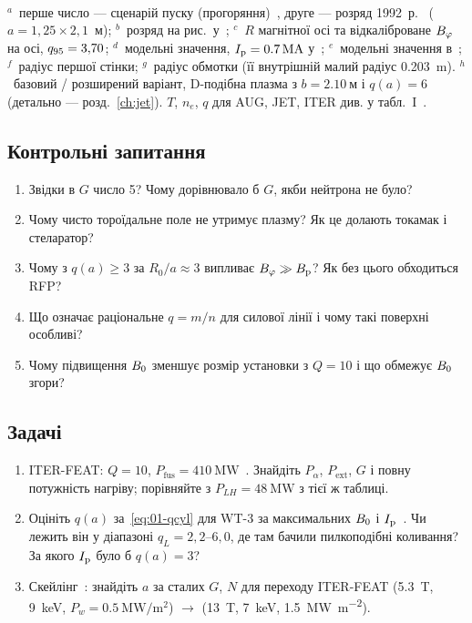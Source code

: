 \begin{table}[h]
\begin{tabular}{@{}lllllll@{}}
\bottomrule
\end{tabular}\\[2pt]
\parbox{\textwidth}{\footnotesize $^{a}$~перше число --- сценарій пуску (прогоряння)~\cite{Hoppe2022}, друге --- розряд 1992~р.~\cite{Fukuyama1992} ($a=1{,}25\times2{,}1$~м);
$^{b}$~розряд на рис.\ у~\cite{AhoMantila2011}; $^{c}$~$R$ магнітної осі та відкаліброване
$B_{\varphi}$ на осі, $q_{95}=3{,}70$; $^{d}$~модельні значення, $I_{\mathrm{p}}=\SI{0.7}{\mega\ampere}$
у~\cite{Wong1987}; $^{e}$~модельні значення в~\cite{Tyshchenko2021}; $^{f}$~радіус першої
стінки; $^{g}$~радіус обмотки (її внутрішній малий радіус \SI{0.203}{\metre}). $^{h}$~базовий / розширений варіант, D-подібна плазма з $b=\SI{2.10}{м}$ і $q(a)=6$
(детально --- розд.~\ref{ch:jet}). $T$, $n_e$, $q$ для AUG, JET, ITER
див. у табл.~I~\cite{vanVugt2019}.}
\end{table}

\subsection*{Контрольні запитання}
\begin{enumerate}
  \item Звідки в $G$ число 5? Чому дорівнювало б $G$, якби нейтрона не було?
  \item Чому чисто тороїдальне поле не утримує плазму? Як це долають токамак і стеларатор?
  \item Чому з $q(a)\ge3$ за $R_0/a\approx3$ випливає $B_{\varphi}\gg B_{\mathrm{p}}$? Як без цього обходиться RFP?
  \item Що означає раціональне $q=m/n$ для силової лінії і чому такі поверхні особливі?
  \item Чому підвищення $B_{0}$ зменшує розмір установки з $Q=10$ і що обмежує $B_{0}$ згори?
\end{enumerate}

\subsection*{Задачі}
\begin{enumerate}
  \item ITER-FEAT: $Q=10$, $P_{\mathrm{fus}}=\SI{410}{\mega\watt}$~\cite{Mazzucato2000}. Знайдіть
        $P_\alpha$, $P_{\mathrm{ext}}$, $G$ і повну потужність нагріву; порівняйте з
        $P_{LH}=\SI{48}{\mega\watt}$ з тієї ж таблиці.
  \item Оцініть $q(a)$ за~\eqref{eq:01-qcyl} для WT-3 за максимальних $B_{0}$ і
        $I_{\mathrm{p}}$~\cite{Hanada1990}. Чи лежить він у діапазоні $q_L=2{,}2$--$6{,}0$, де там
        бачили пилкоподібні коливання? За якого $I_{\mathrm{p}}$ було б $q(a)=3$?
  \item Скейлінг~\cite{Mazzucato2000}: знайдіть $a$ за сталих $G$, $N$ для переходу ITER-FEAT
        (\SI{5.3}{\tesla}, \SI{9}{\kilo\electronvolt}, $P_w=\SI{0.5}{\mega\watt\per\square\metre}$) $\to$
        (\SI{13}{\tesla}, \SI{7}{\kilo\electronvolt}, \SI{1.5}{\mega\watt\per\square\metre}).
\end{enumerate}
